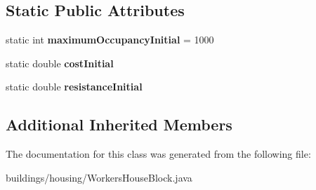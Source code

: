 \subsection*{Static Public Attributes}
\begin{DoxyCompactItemize}
\item 
static int {\bfseries maximum\+Occupancy\+Initial} = 1000\hypertarget{classbuildings_1_1housing_1_1_workers_house_block_ab490930983250da80ec88998ca78f6f5}{}\label{classbuildings_1_1housing_1_1_workers_house_block_ab490930983250da80ec88998ca78f6f5}

\item 
static double {\bfseries cost\+Initial}\hypertarget{classbuildings_1_1housing_1_1_workers_house_block_a9354d8f93eaa82347d54559f02329372}{}\label{classbuildings_1_1housing_1_1_workers_house_block_a9354d8f93eaa82347d54559f02329372}

\item 
static double {\bfseries resistance\+Initial}\hypertarget{classbuildings_1_1housing_1_1_workers_house_block_acd0581339a4b95a0ec348563b9f8be42}{}\label{classbuildings_1_1housing_1_1_workers_house_block_acd0581339a4b95a0ec348563b9f8be42}

\end{DoxyCompactItemize}
\subsection*{Additional Inherited Members}


The documentation for this class was generated from the following file\+:\begin{DoxyCompactItemize}
\item 
buildings/housing/Workers\+House\+Block.\+java\end{DoxyCompactItemize}
